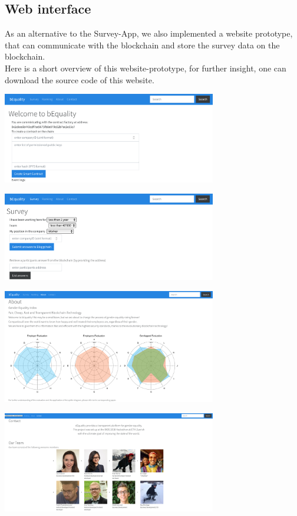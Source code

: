 \documentclass[portrait,a4paper]{article}
\begin{document}
	\subsection{Web interface}
		As an alternative to the Survey-App, we also implemented a website prototype, that can communicate with the blockchain
		and store the survey data on the blockchain.\\
		Here is a short overview of this website-prototype, for further insight, one can download the source code of this website.
		\begin{center}
			\includegraphics[width=0.7\textwidth]{Bilder/Website_1}
		\end{center}
		\begin{center}
			\includegraphics[width=0.7\textwidth]{Bilder/Website_2}
		\end{center}
		\begin{center}
			\includegraphics[width=0.7\textwidth]{Bilder/Website_3}
		\end{center}
		\begin{center}
			\includegraphics[width=0.7\textwidth]{Bilder/Website_4}
		\end{center}
	
\end{document}
